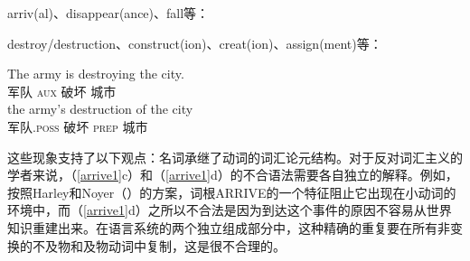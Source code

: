 \begin{exe}\ex
\label{arrive1} 
arriv(al)、disappear(ance)、fall等：
\begin{xlist}[iv.]
\zl

\begin{exe}\ex
\label{trans}
destroy/destruction、construct(ion)、creat(ion)、assign(ment)等：
\begin{xlist}[iv.]
\ex 
\gll The army is destroying the city.\\
      军队 \textsc{aux} 破坏  城市\\
\ex 
\gll the army's destruction of the city\\
      军队.\textsc{poss} 破坏 \textsc{prep}  城市\\
\zl

\noindent
这些现象支持了以下观点：名词承继了动词的词汇论元结构。对于反对词汇主义的学者来说，（\ref{arrive1}c）和（\ref{arrive1}d）的不合语法需要各自独立的解释。例如，按照Harley和Noyer（\citeyear{HN2000a}）的方案，词根ARRIVE的一个特征阻止它出现在小动词的环境中，而（\ref{arrive1}d）之所以不合法是因为到达这个事件的原因不容易从世界知识重建出来。在语言系统的两个独立组成部分中，这种精确的重复要在所有非变换的不及物和及物动词中复制，这是很不合理的。


\end{xlist}
\end{exe}
\end{xlist}
\end{exe}
